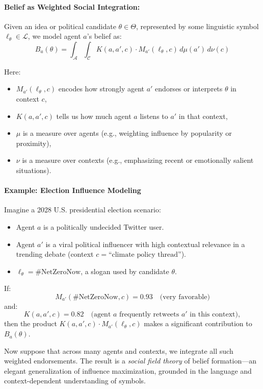 \paragraph{Belief as Weighted Social Integration:}
Given an idea or political candidate \( \theta \in \Theta \), represented by some linguistic symbol \( \ell_\theta \in \mathcal{L} \), we model agent \( a \)'s belief as:
\[
B_a(\theta) = \int_{\mathcal{A}} \int_{\mathcal{C}} K(a, a', c) \cdot M_{a'}(\ell_{\theta}, c) \, d\mu(a') \, d\nu(c)
\]

Here:
\begin{itemize}
    \item \( M_{a'}(\ell_{\theta}, c) \) encodes how strongly agent \( a' \) endorses or interprets \( \theta \) in context \( c \),
    \item \( K(a, a', c) \) tells us how much agent \( a \) listens to \( a' \) in that context,
    \item \( \mu \) is a measure over agents (e.g., weighting influence by popularity or proximity),
    \item \( \nu \) is a measure over contexts (e.g., emphasizing recent or emotionally salient situations).
\end{itemize}

\paragraph{Example: Election Influence Modeling}

Imagine a 2028 U.S. presidential election scenario:
\begin{itemize}
    \item Agent \( a \) is a politically undecided Twitter user.
    \item Agent \( a' \) is a viral political influencer with high contextual relevance in a trending debate (context \( c = \text{``climate policy thread''} \)).
    \item \( \ell_\theta = \text{\#NetZeroNow} \), a slogan used by candidate \( \theta \).
\end{itemize}

If:
\[
M_{a'}(\text{\#NetZeroNow}, c) = 0.93 \quad \text{(very favorable)}
\]
and:
\[
K(a, a', c) = 0.82 \quad \text{(agent $a$ frequently retweets $a'$ in this context)},
\]
then the product \( K(a, a', c) \cdot M_{a'}(\ell_{\theta}, c) \) makes a significant contribution to \( B_a(\theta) \).

Now suppose that across many agents and contexts, we integrate all such weighted endorsements. The result is a \textit{social field theory} of belief formation—an elegant generalization of influence maximization, grounded in the language and context-dependent understanding of symbols.

